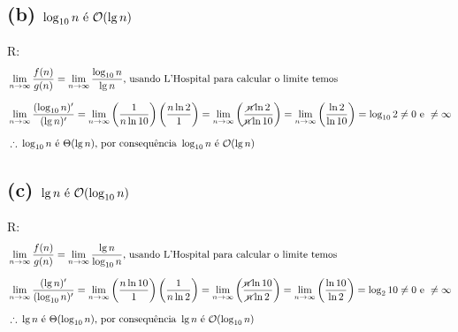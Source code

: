 
  \subsection*{(b) $\log_{10} n \text{ é } \mathcal{O}(\lg n)$}
  R:
  \begin{equation}
    \setlength{\jot}{10pt}
    \begin{aligned}
    &\lim_{n \to\infty} \frac{f(n)}{g(n)} = \lim_{n \to\infty} \frac{\log_{10} n}{\lg n} \text{, usando L'Hospital para calcular o limite temos} \\
    &\lim_{n \to\infty} \frac{(\log_{10} n)'}{(\lg n)'} = \lim_{n \to\infty} \left(\frac{1}{n \ln 10}\right) \left(\frac{n \ln 2}{1}\right) = \lim_{n \to\infty} \left(\frac{\cancel{n} \ln 2}{\cancel{n} \ln 10}\right) = \lim_{n \to\infty} \left(\frac{\ln 2}{\ln 10}\right) = \log_{10} 2 \neq 0 \text{ e } \neq \infty \\
    &\therefore\: \log_{10} n \text{ é } \Theta(\lg n) \text{, por consequência } \log_{10} n \text{ é } \bigO(\lg n)
  \end{aligned}\end{equation}


  \subsection*{(c) $\lg n \text{ é } \mathcal{O}(\log_{10} n)$}
  R:
  \begin{equation}
    \setlength{\jot}{10pt}
    \begin{aligned}
    &\lim_{n \to\infty} \frac{f(n)}{g(n)} = \lim_{n \to\infty} \frac{\lg n}{\log_{10} n} \text{, usando L'Hospital para calcular o limite temos} \\
    &\lim_{n \to\infty} \frac{(\lg n)'}{(\log_{10} n)'} = \lim_{n \to\infty} \left(\frac{n \ln 10}{1}\right) \left(\frac{1}{n \ln 2}\right) = \lim_{n \to\infty} \left(\frac{\cancel{n} \ln 10}{\cancel{n} \ln 2}\right) = \lim_{n \to\infty} \left(\frac{\ln 10}{\ln 2}\right) = \log_{2} 10 \neq 0 \text{ e } \neq \infty \\
    &\therefore\: \lg n \text{ é } \Theta(\log_{10} n) \text{, por consequência } \lg n \text{ é } \bigO(\log_{10} n)
  \end{aligned}\end{equation}
